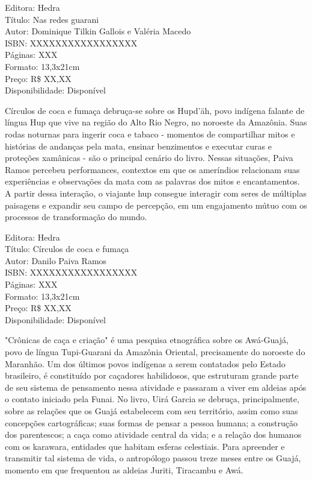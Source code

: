 \begin{ficha}
Editora: Hedra\\
Título: Nas redes guarani\\
Autor: Dominique Tilkin Gallois e Valéria Macedo\\ 
ISBN: XXXXXXXXXXXXXXXXX\\
Páginas: XXX\\
Formato: 13,3x21cm\\
Preço: R\$ XX,XX\\
Disponibilidade: Disponível
\end{ficha}

\pagebreak


\noindent{}Círculos de coca e fumaça debruça-se sobre os Hupd’äh, povo indígena falante de língua Hup que vive na região do Alto Rio Negro, no noroeste da Amazônia. Suas rodas noturnas para ingerir coca e tabaco - momentos de compartilhar mitos e histórias de andanças pela mata, ensinar benzimentos e executar curas e proteções xamânicas - são o principal cenário do livro. Nessas situações, Paiva Ramos percebeu performances, contextos em que os ameríndios relacionam suas experiências e observações da mata com as palavras dos mitos e encantamentos. A partir dessa interação, o viajante hup consegue interagir com seres de múltiplas paisagens e expandir seu campo de percepção, em um engajamento mútuo com os processos de transformação do mundo.

\begin{ficha}
Editora: Hedra\\
Título: Círculos de coca e fumaça\\
Autor:  Danilo Paiva Ramos\\ 
ISBN: XXXXXXXXXXXXXXXXX\\
Páginas: XXX\\
Formato: 13,3x21cm\\
Preço: R\$ XX,XX\\
Disponibilidade: Disponível
\end{ficha}

\pagebreak


\noindent{}"Crônicas de caça e criação" é uma pesquisa etnográfica sobre os Awá-Guajá, povo de língua Tupi-Guarani da Amazônia Oriental, precisamente do noroeste do Maranhão. Um dos últimos povos indígenas a serem contatados pelo Estado brasileiro, é constituído por caçadores habilidosos, que estruturam grande parte de seu sistema de pensamento nessa atividade e passaram a viver em aldeias após o contato iniciado pela Funai. No livro, Uirá Garcia se debruça, principalmente, sobre as relações que os Guajá estabelecem com seu território, assim como suas concepções cartográficas; suas formas de pensar a pessoa humana; a construção dos parentescos; a caça como atividade central da vida; e a relação dos humanos com os karawara, entidades que habitam esferas celestiais. Para apreender e transmitir tal sistema de vida, o antropólogo passou treze meses entre os Guajá, momento em que frequentou as aldeias Juriti, Tiracambu e Awá.


